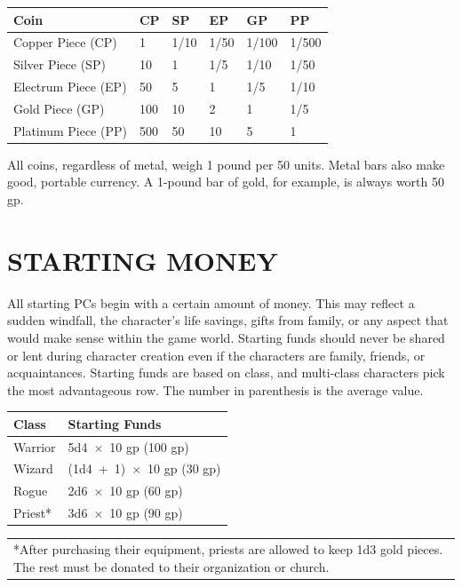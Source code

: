 \begin{multicols}{2}
\noindent
\begin{minipage}{\columnwidth}

\label{exchangerates}
\noindent
\begin{tabular}{|p{}|p{}|p{}|p{}|p{}|p{}|}
\hline
Coin	& CP	& SP	& EP	& GP	& PP \\
\hline\hline
\rowcolor[gray]{.9}Copper Piece (CP)	& 1	& 1/10	& 1/50	& 1/100	& 1/500 \\
Silver Piece (SP)	& 10	& 1	& 1/5	& 1/10	& 1/50 \\
\rowcolor[gray]{.9}Electrum Piece (EP)	& 50	& 5	& 1	& 1/5	& 1/10 \\
Gold Piece (GP)		& 100	& 10	& 2	& 1	& 1/5 \\
\rowcolor[gray]{.9}Platinum Piece (PP)	& 500	& 50	& 10	& 5	& 1 \\
\hline
\end{tabular}

\end{minipage}

All coins, regardless of metal, weigh 1 pound per 50 units.  Metal bars also make good, portable currency.  A 1-pound bar of gold, for example, is always worth 50 gp.

\section{STARTING MONEY}

All starting PCs begin with a certain amount of money.  This may reflect a sudden windfall, the character's life savings, gifts from family, or any aspect that would make sense within the game world.  Starting funds should never be shared or lent during character creation even if the characters are family, friends, or acquaintances.  Starting funds are based on class, and multi-class characters pick the most advantageous row.  The number in parenthesis is the average value.

\noindent
\begin{minipage}{\columnwidth}

\label{exchangerates}
\noindent
\begin{tabular}{|p{}|p{}|}
\hline
Class	& Starting Funds \\
\hline\hline
\rowcolor[gray]{.9}Warrior	& 5d4~$\times$~10 gp (100 gp) \\
Wizard	& (1d4~+~1)~$\times$~10 gp (30 gp) \\
\rowcolor[gray]{.9}Rogue	& 2d6~$\times$~10 gp (60 gp) \\
Priest*	& 3d6~$\times$~10 gp (90 gp) \\
\hline
\end{tabular}
\noindent\begin{tabular}{p{}}
*After purchasing their equipment, priests are allowed to keep 1d3 gold pieces.  The rest must be donated to their organization or church. \\
\end{tabular}\vspace{.5em}


\end{minipage}
\end{multicols}
